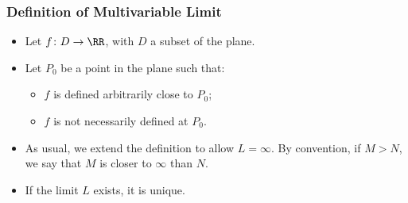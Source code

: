 \begin{frame}
\frametitle{Definition of Multivariable Limit}
\begin{itemize}
\item Let $f\colon D \to \RR$, with $D$ a subset of the plane.
\item Let $P_0$ be a point in the plane such that:
\begin{itemize}
\item $f$ is defined arbitrarily close to $P_0$;
\item $f$ is not necessarily defined at $P_0$.
\end{itemize}
\item<4-> As usual, we extend the definition to allow $L=\infty$. By convention, if $M>N$, we say that $M$ is closer to $\infty$ than $N$.
\item<5-> If the limit $L$ exists, it is unique.
\end{itemize}
\end{frame}